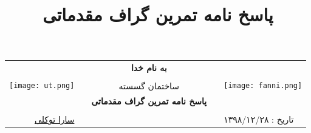 \documentclass{ut}
\title{ پاسخ نامه تمرین گراف مقدماتی }
\begin{document}
    \thispagestyle{empty}
    \begin{tabular}{r p{} c p{} l}
        \multirow{5}{*}{\texttt{[image: ut.png]}}
        &&\multirow{2}{*}{\textbf{به نام خدا}}&&
        \multirow{5}{*}{\texttt{[image: fanni.png]}}\\
        &&&& \\
        &&&& \\
        &&ساختمان گسسته&& \\
        &&\textbf{پاسخ نامه تمرین گراف مقدماتی}&& \\
        \\
        \href{mailto:saratvk1377@gmail.com}{سارا توکلی} &&&& تاریخ : ۱۳۹۸/۱۲/۲۸ \\
        \hline
    \end{tabular}
\end{document}
